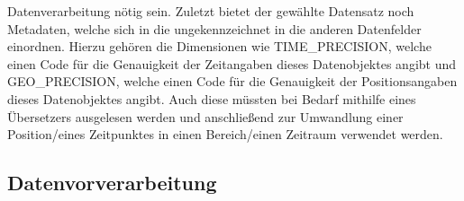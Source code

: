 \documentclass[usegeometry=true]{scrartcl}
\begin{document}
Datenverarbeitung nötig sein. Zuletzt bietet der gewählte Datensatz noch Metadaten, welche sich in die ungekennzeichnet in die anderen Datenfelder einordnen. Hierzu gehören die Dimensionen wie TIME\_PRECISION, welche einen Code für die Genauigkeit der Zeitangaben dieses Datenobjektes angibt und GEO\_PRECISION, welche einen Code für die Genauigkeit der Positionsangaben dieses Datenobjektes angibt. Auch diese müssten bei Bedarf mithilfe eines Übersetzers ausgelesen werden und anschließend zur Umwandlung einer Position/eines Zeitpunktes in einen Bereich/einen Zeitraum verwendet werden.\\

\subsection{Datenvorverarbeitung} \label{sec:datenvorverarbeitung}
\end{document}
